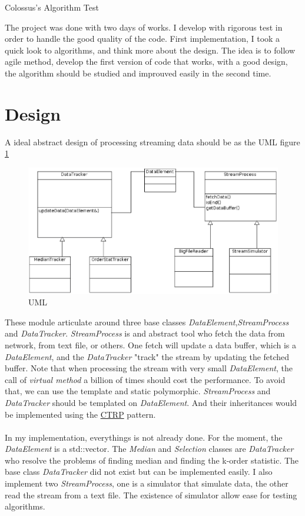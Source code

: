 \documentclass[a4paper,10pt]{article}
\begin{document}
\begin{center}
Colossus's Algorithm Test 
\end{center}
The project was done with two days of works. I develop with rigorous test in order to handle the good quality of the code. First implementation, I took a quick look to algorithms, and think more about the design. The idea is to follow agile method, develop the first version of code that works, with a good design, the algorithm should be studied and improuved easily in the second time. 
\section{Design} 
A ideal abstract design of processing streaming data should be as the UML figure \ref{fig:uml}
\begin {figure}[h]
\begin{center}
\includegraphics[scale=0.4]{ClassDiagram}
\caption{\label{fig:uml}UML}
\end{center}
\end {figure}
These module articulate around three base classes \textit{DataElement},\textit{StreamProcess} and \textit{DataTracker}. \textit{StreamProcess} is and abstract tool who fetch the data from network, from text file, or others. One fetch will update a data buffer, which is a \textit{DataElement}, and the \textit{DataTracker} "track" the stream by updating the fetched buffer. Note that when processing the stream with very small \textit{DataElement}, the call of \textit{virtual method} a billion of times should cost the performance. To avoid that, we can use the template and static polymorphic. \textit{StreamProcess} and \textit{DataTracker} should be templated on \textit{DataElement}. And their inheritances would be implemented using the \href{http://en.wikipedia.org/wiki/Curiously_recurring_template_pattern}{CTRP} pattern.      
\paragraph{} In my implementation, everythings is not already done. For the moment, the \textit{DataElement} is a std::vector. The \textit{Median} and \textit{Selection} classes are \textit{DataTracker} who resolve the problems of finding median and finding the k-order statistic. The base class \textit{DataTracker} did not exist but can be implemented easily. I also implement two \textit{StreamProcess}, one is a simulator that simulate data, the other read the stream from a text file. The existence of simulator allow ease for testing algorithms.
\end{document}
